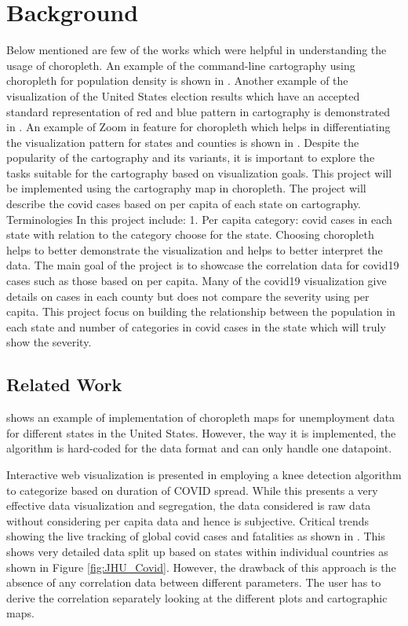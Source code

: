 
\section{Background}
\label{sec:background}


Below mentioned are few of the works which were helpful in understanding the usage of choropleth. An example of the command-line cartography using choropleth for population density is shown in \cite {med}. Another example of the visualization of the United States election results which have an accepted standard representation of red and blue pattern in cartography is demonstrated in \cite{NYT}. An example of Zoom in feature for choropleth which helps in differentiating the visualization pattern for states and counties is shown in \cite{cmgiven}. Despite the popularity of the cartography and its variants, it is important to explore the tasks suitable for the cartography based on visualization goals. This project will be implemented using the cartography map in choropleth. The project will describe the covid cases based on per capita of each state on cartography. Terminologies In this project include: 1. Per capita category: covid cases in each state with relation to the category choose for the state. Choosing choropleth helps to better demonstrate the visualization and helps to better interpret the data. The main goal of the project is to showcase the correlation data for covid19 cases such as those based on per capita. Many of the covid19 visualization give details on cases in each county but does not compare the severity using per capita. This project focus on building the relationship between the population in each state and number of categories in covid cases in the state which will truly show the severity.

\subsection{Related Work}
\label{sec:related}


\cite{choroUn} shows an example of implementation of choropleth maps for unemployment data for different states in the United States. However, the way it is implemented, the algorithm is hard-coded for the data format and can only handle one datapoint. 

Interactive web visualization is presented in \cite{covidviz} employing a knee detection algorithm to categorize based on duration of COVID spread. While this presents a very effective data visualization and segregation, the data considered is raw data without considering per capita data and hence is subjective. Critical trends showing the live tracking of global covid cases and fatalities as shown in \cite{jhu}. This shows very detailed data split up based on states within individual countries as shown in Figure \ref{fig:JHU_Covid}. However, the drawback of this approach is the absence of any correlation data between different parameters. The user has to derive the correlation separately looking at the different plots and cartographic maps.

